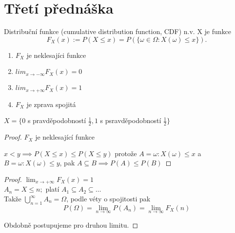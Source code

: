 \documentclass[../main.tex]{subfiles}
\begin{document}
\section{Třetí přednáška}

\begin{definition}
    Distribuční funkce (cumulative distribution function, CDF) n.v. X
    je funkce
    \[F_X(x) := P(X\leq x) = P(\{\omega \in \Omega : X(\omega) \leq x\}).\]
    \begin{enumerate}
        \item $F_X$ je neklesajíci funkce
        \item $lim_{x \rightarrow -\infty} F_X(x) = 0$
        \item $lim_{x \rightarrow +\infty} F_X(x) = 1$
        \item $F_X$ je zprava spojitá
    \end{enumerate}
\end{definition}

\begin{example}
    $X = \{0$ s pravděpodobností $\frac{1}{2}, 1$ s psravděpodobností $\frac{1}{2}\}$
\end{example}
\begin{proof}
    $F_X$ je neklesající funkce

    \noindent
    $x<y \implies P(X\leq x) \leq P(X\leq y)$ protože $A = {\omega : X(\omega) \leq x}$ a\\
    $B = {\omega : X(\omega) \leq y}$, pak $A\subseteq B \implies P(A) \leq P(B)$
\end{proof}

\begin{proof}
    $\lim_{x\rightarrow +\infty} F_X(x) = 1$\\
    $A_n = {X\leq n};$ platí $A_1 \subseteq A_2 \subseteq \dots$\\
    Takže $\bigcup^\infty_{n=1} A_n = \Omega$, podle véty o spojitosti pak\\
    \[P(\Omega) = \lim_{n\rightarrow \infty} P(A_n) = \lim_{n\rightarrow \infty} F_X(n)\]

    Obdobně postupujeme pro druhou limitu.
\end{proof}
\end{document}
